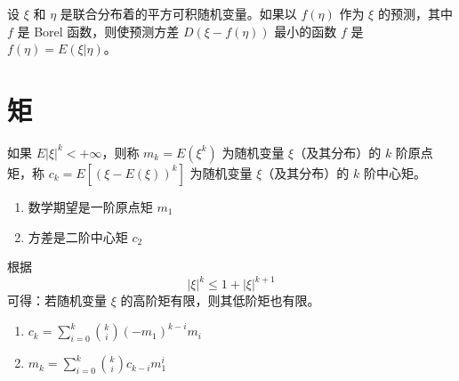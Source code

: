 \documentclass[12pt,a4paper]{amsart}
\begin{document}
\begin{proposition}
    设 $\xi$ 和 $\eta$ 是联合分布着的平方可积随机变量。如果以 $f(\eta)$ 作为 $\xi$ 的预测，其中 $f$ 是 Borel 函数，则使预测方差 $D(\xi - f(\eta))$ 最小的函数 $f$ 是 $f(\eta) = E(\xi | \eta)$。
\end{proposition}

\section{矩}

\begin{definition}[矩]
    如果 $E|\xi|^k<+\infty$，则称 $m_k = E(\xi^k)$ 为随机变量 $\xi$（及其分布）的 $k$ 阶原点矩，称 $c_k = E[(\xi - E(\xi))^k]$ 为随机变量 $\xi$（及其分布）的 $k$ 阶中心矩。
\end{definition}

\begin{proposition}[低阶原点矩]
    \begin{enumerate}
        \item 数学期望是一阶原点矩 $m_1$
        \item 方差是二阶中心矩 $c_2$
    \end{enumerate}
\end{proposition}

\begin{proposition}
    根据
    \begin{equation}
        |\xi|^k \leq 1 + |\xi|^{k+1}
    \end{equation}
    可得：若随机变量 $\xi$ 的高阶矩有限，则其低阶矩也有限。
\end{proposition}

\begin{proposition}[原点矩和中心矩的关系]
    \begin{enumerate}
        \item $c_k = \sum_{i=0}^{k} \binom{k}{i} (-m_1)^{k-i}m_i$
        \item $m_k = \sum_{i=0}^{k} \binom{k}{i} c_{k-i}m_1^i$
    \end{enumerate}
\end{proposition}

\appendix


{\footnotesize}
\end{document}
